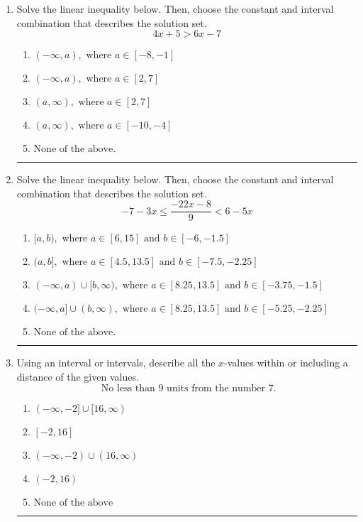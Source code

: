 \documentclass[14pt]{extbook}
\newcommand{\litem}[1]{\item#1\hspace*{-1cm}\rule{\textwidth}{0.4pt}}
\begin{document}
\begin{enumerate}
\litem{
Solve the linear inequality below. Then, choose the constant and interval combination that describes the solution set.\[ 4x + 5 > 6x -7 \]\begin{enumerate}[label=\Alph*.]
\item \( (-\infty, a), \text{ where } a \in [-8, -1] \)
\item \( (-\infty, a), \text{ where } a \in [2, 7] \)
\item \( (a, \infty), \text{ where } a \in [2, 7] \)
\item \( (a, \infty), \text{ where } a \in [-10, -4] \)
\item \( \text{None of the above}. \)

\end{enumerate} }
\litem{
Solve the linear inequality below. Then, choose the constant and interval combination that describes the solution set.\[ -7 - 3 x \leq \frac{-22 x - 8}{9} < 6 - 5 x \]\begin{enumerate}[label=\Alph*.]
\item \( [a, b), \text{ where } a \in [6, 15] \text{ and } b \in [-6, -1.5] \)
\item \( (a, b], \text{ where } a \in [4.5, 13.5] \text{ and } b \in [-7.5, -2.25] \)
\item \( (-\infty, a) \cup [b, \infty), \text{ where } a \in [8.25, 13.5] \text{ and } b \in [-3.75, -1.5] \)
\item \( (-\infty, a] \cup (b, \infty), \text{ where } a \in [8.25, 13.5] \text{ and } b \in [-5.25, -2.25] \)
\item \( \text{None of the above.} \)

\end{enumerate} }
\litem{
Using an interval or intervals, describe all the $x$-values within or including a distance of the given values.\[ \text{ No less than } 9 \text{ units from the number } 7. \]\begin{enumerate}[label=\Alph*.]
\item \( (-\infty, -2] \cup [16, \infty) \)
\item \( [-2, 16] \)
\item \( (-\infty, -2) \cup (16, \infty) \)
\item \( (-2, 16) \)
\item \( \text{None of the above} \)


\end{enumerate}}
\end{enumerate}
\end{document}
